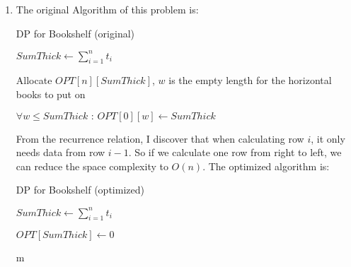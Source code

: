 \documentclass[12pt,a4paper]{article}
\makeatletter
\newtheorem*{solution}{Solution}
\theoremstyle{definition}
\renewenvironment{solution}[1][Solution] {\par\pushQED{\qed}\normalfont\topsep6\p@\@plus6\p@\relax\trivlist\item[\hskip\labelsep\bfseries#1\@addpunct{.}]\ignorespaces}{\popQED\endtrivlist\@endpefalse} \makeatother
\makeatother
\begin{document}
\begin{enumerate}
\begin{solution}
        The original Algorithm of this problem is:\\
        \begin{minipage}[t]{0.89\textwidth}
        	\begin{algorithm}[H]
        		\BlankLine
        		\caption{DP for Bookshelf (original)}
        		\label{Alg-1}
        		
        		$ SumThick \leftarrow \sum_{i = 1}^{n}t_i$\;
        		
        		Allocate $ OPT[n][SumThick] $, $ w $ is the empty length for the horizontal books to put on\;
        		
        		$ \forall w\le SumThick\text{ : }OPT[0][w]\leftarrow SumThick $\;
        		
        		
        		\;
        		
        	\end{algorithm}
        \end{minipage}
    
        From the recurrence relation, I discover that when calculating row $ i $, it only needs data from row $ i - 1 $. So if we calculate one row from right to left, we can reduce the space complexity to $ O(n) $. The optimized algorithm is:\\
        \begin{minipage}[t]{0.89\textwidth}
        	\begin{algorithm}[H]
        		\BlankLine
        		\caption{DP for Bookshelf (optimized)}
        		\label{Alg-2}
        		
        		$ SumThick \leftarrow \sum_{i = 1}^{n}t_i$\;
        		
        		$ OPT[SumThick]\leftarrow 0 $\;
        		
        		m
        		

\end{algorithm}
\end{minipage}
\end{solution}
\end{enumerate}
\end{document}
